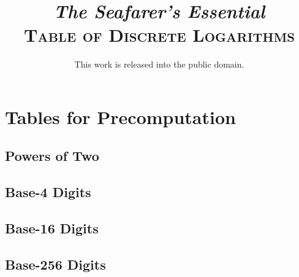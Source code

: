 \documentclass[8pt,a4paper]{extbook}
\title{
\emph{The Seafarer's Essential}\\
\textsc{Table of Discrete Logarithms}
}
\author{}
\date{This work is released into the public domain.}
\begin{document}
\maketitle
\tableofcontents

\chapter{Tables for Precomputation}
\section{Powers of Two}


\clearpage
\section{Base-4 Digits}


\clearpage
\section{Base-16 Digits}


\clearpage
\section{Base-256 Digits}

\end{document}

